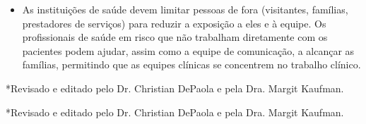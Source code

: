 \documentclass[onecolumn,journal]{IEEEtran}
\begin{document}
\begin{multicols}{2}
\begin{itemize}
    \item As instituições de saúde devem limitar pessoas de fora (visitantes, famílias, prestadores de serviços) para reduzir a exposição a eles e à equipe. Os profissionais de saúde em risco que não trabalham diretamente com os pacientes podem ajudar, assim como a equipe de comunicação, a alcançar as famílias, permitindo que as equipes clínicas se concentrem no trabalho clínico.
    
\end{itemize}

*Revisado e editado pelo Dr. Christian DePaola e pela Dra. Margit Kaufman.

\end{multicols}

*Revisado e editado pelo Dr. Christian DePaola e pela Dra. Margit Kaufman.

% 

\end{document}
